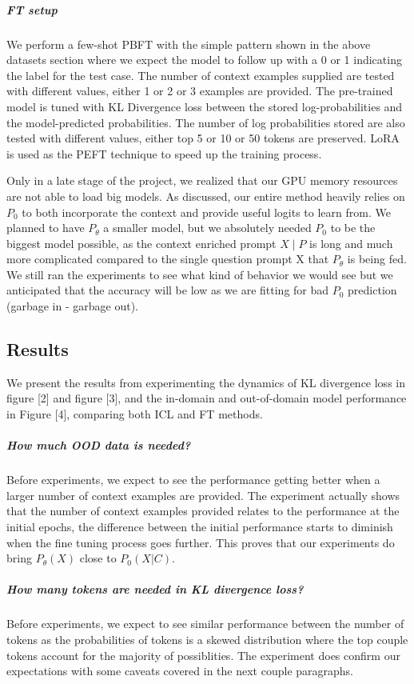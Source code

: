 \documentclass[10pt,twocolumn,letterpaper]{article}
\begin{document}
\subparagraph*{FT setup}
We perform a few-shot PBFT with the simple pattern shown in the above datasets section where we expect the model to follow up with a 0 or 1 indicating the label for the test case. The number of context examples supplied are tested with different values, either 1 or 2 or 3 examples are provided. The pre-trained model is tuned with KL Divergence loss between the stored log-probabilities and the model-predicted probabilities. The number of log probabilities stored are also tested with different values, either top 5 or 10 or 50 tokens are preserved. LoRA is used as the PEFT technique to speed up the training process.
\linebreak

Only in a late stage of the project, we realized that our GPU memory resources are not able to load big models. As discussed, our entire method heavily relies on $P_0$ to both incorporate the context and provide useful logits to learn from.
We planned to have $P_\theta$ a smaller model, but we absolutely needed $P_0$ to be the biggest model possible, as the context enriched prompt $X \mid P$ is long and much more complicated compared to the single question prompt X that $P_\theta$ is being fed. We still ran the experiments to see what kind of behavior we would see but we anticipated that the accuracy will be low as we are fitting for bad $P_0$ prediction (garbage in - garbage out). 


\subsection*{Results}
We present the results from experimenting the dynamics of KL divergence loss in figure [2] and figure [3], and the in-domain and out-of-domain model performance in Figure [4], comparing both ICL and FT methods.

\subparagraph*{How much OOD data is needed?}
Before experiments, we expect to see the performance getting better when a larger number of context examples are provided. The experiment actually shows that the number of context examples provided relates to the performance at the initial epochs, the difference between the initial performance starts to diminish when the fine tuning process goes further. This proves that our experiments do bring $P_\theta(X)$ close to $P_0(X|C)$.

\subparagraph*{How many tokens are needed in KL divergence loss?}
Before experiments, we expect to see similar performance between the number of tokens as the probabilities of tokens is a skewed distribution where the top couple tokens account for the majority of possiblities. The experiment does confirm our expectations with some caveats covered in the next couple paragraphs.
\end{document}
